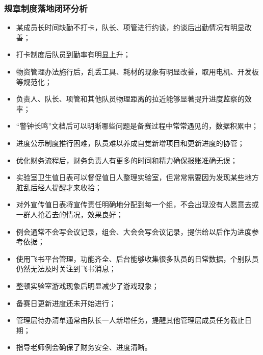     \subsubsection{规章制度落地闭环分析}


        \begin{itemize}
            \item 某成员长时间缺勤不打卡，队长、项管进行约谈，约谈后出勤情况有明显改善；
            \item 打卡制度后队员到勤率有明显上升；
            \item 物资管理办法施行后，乱丢工具、耗材的现象有明显改善，取用电机、开发板等规范化；
            \item 负责人、队长、项管和其他队员物理距离的拉近能够显著提升进度监察的效率；
            \item “警钟长鸣”文档后可以明晰哪些问题是备赛过程中常常遇见的，数据积累中；
            \item 进度公示制度推行困难，队员难以养成自觉新增项目和更新进度的协管；
            \item 优化财务流程后，财务负责人有更多的时间和精力确保报账准确无误；
            \item 实验室卫生值日表可以督促值日人整理实验室，但常常需要因为发现某些地方脏乱后经人提醒才来收拾；
            \item 对外宣传值日表将宣传责任明确地分配到每一个组，不会出现没有人愿意去或一群人抢着去的情况，效果良好；
            \item 例会通常不会写会议记录，组会、大会会写会议记录，提供给以后作为进度参考依据；
            \item 使用飞书平台管理，功能齐全、后台能够收集很多队员的日常数据，个别队员仍然无法及时关注到飞书消息；
            \item 整顿实验室游戏现象后明显减少了游戏现象；
            \item 备赛日更新进度还未开始进行；
            \item 管理层待办清单通常由队长一人新增任务，提醒其他管理层成员任务截止日期；
            \item 指导老师例会确保了财务安全、进度清晰。
        \end{itemize}